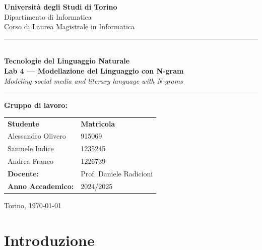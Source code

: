 \documentclass[12pt, a4paper]{article}
\begin{document}

\begin{titlepage}
    \centering
    \vspace*{0.8cm}

    {\Large \textbf{Università degli Studi di Torino}}\\[0.2cm]
    {\large Dipartimento di Informatica}\\[0.1cm]
    {\large Corso di Laurea Magistrale in Informatica}

    \vspace{1.5cm}
    \rule{\linewidth}{0.8mm}\\[0.6cm]

    {\LARGE \textbf{Tecnologie del Linguaggio Naturale}}\\[0.4cm]
    {\Large \textbf{Lab 4 --- Modellazione del Linguaggio con N-gram}}\\[0.3cm]
    {\large \textit{Modeling social media and literary language with N-grams}}\\[0.6cm]

    \rule{\linewidth}{0.8mm}

    \vspace{1.8cm}

    {\large \textbf{Gruppo di lavoro:}}\\[0.5cm]

    \begin{tabular}{ll}
        \textbf{Studente}       & \textbf{Matricola} \\[0.3cm]
        Alessandro Olivero      & 915069  \\[0.2cm]
        Samuele Iudice          & 1235245 \\[0.2cm]
        Andrea Franco           & 1226739 \\[0.5cm]
        \textbf{Docente:}       & Prof. Daniele Radicioni \\[0.2cm]
        \textbf{Anno Accademico:} & 2024/2025 \\
    \end{tabular}

    \vfill
    {\large Torino, \today}
\end{titlepage}

\tableofcontents
\newpage

\section{Introduzione}
\end{document}
